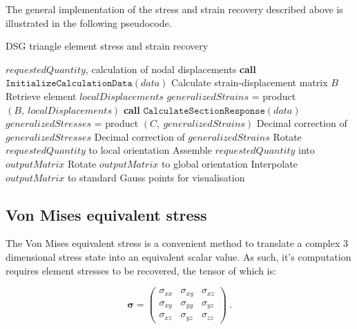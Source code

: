 The general implementation of the stress and strain recovery described above is illustrated in the following pseudocode.

\begin{algorithm}
	\caption{DSG triangle element stress and strain recovery}
	\label{DSG triangle element stress and strain recovery}
	\begin{algorithmic}[1]
		\Require $requestedQuantity$, calculation of nodal displacements
		\State \textbf{call} $\texttt{InitializeCalculationData}(data)$
		\State \hspace{\algorithmicindent}Calculate strain-displacement matrix $B$
		\State \hspace{\algorithmicindent}Retrieve element $localDisplacements$
		\State $generalizedStrains$ = product$(B,\ localDisplacements)$
				\State \textbf{call} $\texttt{CalculateSectionResponse}(data)$
				\State $generalizedStresses$ = product $(C,\ generalizedStrains)$
				\State Decimal correction of $generalizedStresses$
		\EndIf
		\State Decimal correction of $generalizedStrains$ 
				\State Rotate $requestedQuantity$ to local orientation
		\EndIf
		\State Assemble $requestedQuantity$ into $outputMatrix$
				\State Rotate $outputMatrix$ to global orientation
		\EndIf
		\State Interpolate $outputMatrix$ to standard Gauss points for visualisation
	\end{algorithmic}
\end{algorithm}

\subsection{Von Mises equivalent stress}

The Von Mises equivalent stress is a convenient method to translate a complex 3 dimensional stress state into an equivalent scalar value. As such, it's computation requires element stresses to be recovered, the tensor of which is:

\begin{equation} 
\boldsymbol{\sigma} = 
\begin{pmatrix}
\sigma_{xx} & \sigma_{xy} & \sigma_{xz} \\
\sigma_{xy} & \sigma_{yy} & \sigma_{yz} \\
\sigma_{xz} & \sigma_{yz} & \sigma_{zz}
\end{pmatrix}
\label{eqt22}\ .
\end{equation}

